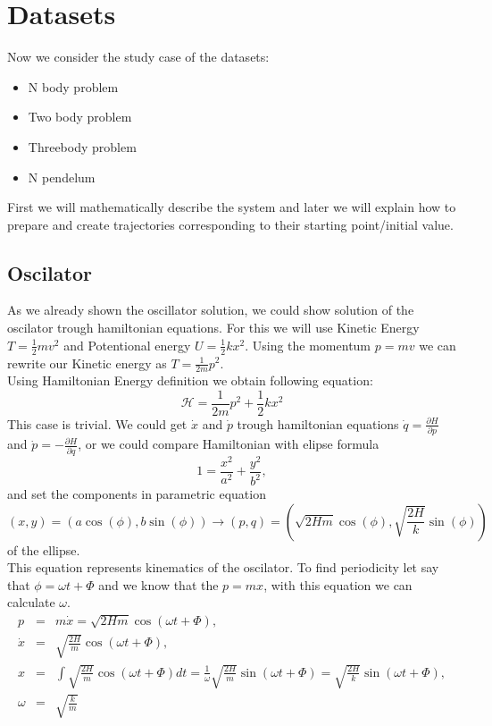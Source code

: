 \chapter{Datasets}
Now we consider the study case of the datasets:
\begin{itemize}
	\item  N body problem
	\item Two body problem
	\item Threebody problem
	\item N pendelum
\end{itemize}
First we will mathematically describe the system and later we will explain how to prepare and create trajectories corresponding to their starting point/initial value. 


\section{Oscilator}
As we already shown the oscillator solution, we could show solution of the oscilator trough hamiltonian equations.
For this we will use Kinetic Energy $T =\frac{1}{2}mv^2$ and Potentional energy $U = \frac{1}{2}kx^2$. Using the momentum $p = mv$ we can rewrite our 
Kinetic energy as  $T =\frac{1}{2m}p^2$.\\
Using Hamiltonian Energy definition we obtain following equation: 
\begin{equation}
	\mathcal{H} = \frac{1}{2m}p^2 + \frac{1}{2}kx^2
\end{equation} 
This case is trivial.
We could get $\dot{x}$ and $\dot{p}$ trough hamiltonian equations $\dot{q} = \frac{\partial H}{\partial p}$ and $\dot{p} = - \frac{\partial H}{\partial q}$,
or we could compare Hamiltonian with elipse formula
\begin{equation}
	1 = \frac{x^2}{a^2} + \frac{y^2}{b^2},
\end{equation} and set the components in parametric equation\begin{equation}
(x,y) = (a\cos(\phi),b\sin(\phi)) \rightarrow(p,q) = \left(\sqrt{2Hm}\cos(\phi),\sqrt{\frac{2H}{k}}\sin(\phi)\right)
\end{equation} of the ellipse.\\ This equation represents kinematics of the oscilator. To find periodicity let say that $\phi = \omega t + \Phi $ and we know that the $p = mx$, with this equation we can calculate $\omega$.
\begin{eqnarray}
	p &=& m\dot{x} =\sqrt{2Hm}\cos(\omega t + \Phi), \\
	\dot{x} &=& \sqrt{\frac{2H}{m}}\cos(\omega t + \Phi),\\
		x &=& \int \sqrt{\frac{2H}{m}}\cos(\omega t + \Phi)dt = \frac{1}{\omega}\sqrt{\frac{2H}{m}}\sin(\omega t + \Phi) = \sqrt{\frac{2H}{k}} \sin(\omega t + \Phi),\\
	\omega &=& \sqrt{\frac{k}{m}} 
\end{eqnarray}  




